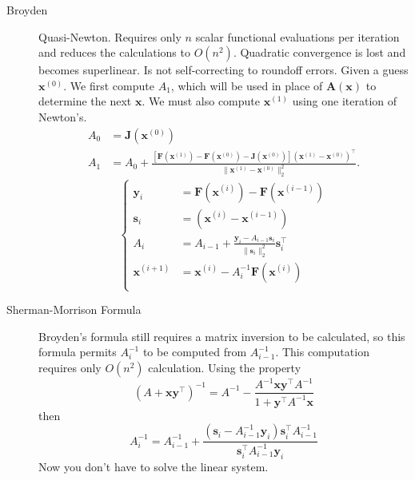 \documentclass[8pt]{article}
\begin{document}
\begin{multicols}{2}
\begin{description}
    \item[Broyden] Quasi-Newton. Requires only $n$ scalar functional evaluations per iteration and
      reduces the calculations to $O(n^2)$.  Quadratic convergence is lost and becomes
      superlinear. Is not self-correcting to roundoff errors. Given a guess $\mathbf{x}^{(0)}$.
      We first compute $A_1$, which will be used in place of $\mathbf{A}(\mathbf{x})$ to determine
      the next $\mathbf{x}$. We must also compute $\mathbf{x}^{(1)}$ using one iteration of Newton's.
      \begin{equation*}
        \begin{aligned}
          A_0&=\mathbf{J}(\mathbf{x}^{(0)}) \\
          A_1&=A_0+\frac{[\mathbf{F}(\mathbf{x}^{(1)}) -
            \mathbf{F}(\mathbf{x}^{(0)}) -
            \mathbf{J}(\mathbf{x}^{(0)})](\mathbf{x}^{(1)}-\mathbf{x}^{(0)})^\top}{\|\mathbf{x}^{(1)}-\mathbf{x}^{(0)}\|^2_2}.
        \end{aligned}
      \end{equation*}
      \begin{equation*}
        \left\{
        \begin{aligned}
          \mathbf{y}_i&=\mathbf{F}(\mathbf{x}^{(i)})-\mathbf{F}(\mathbf{x}^{(i-1)}) \\
          \mathbf{s}_i&=(\mathbf{x}^{(i)}-\mathbf{x}^{(i-1)}) \\
          A_i&=A_{i-1}+\frac{\mathbf{y}_i-A_{i-1}\mathbf{s}_i}{\|\mathbf{s}_i\|^2_2}\mathbf{s}_i^\top \\
          \mathbf{x}^{(i+1)}&=\mathbf{x}^{(i)}-A_i^{-1}\mathbf{F}(\mathbf{x}^{(i)}) \\
        \end{aligned}
        \right.
      \end{equation*}
    \item[Sherman-Morrison Formula] Broyden's formula still requires a matrix inversion to be
      calculated, so this formula permits $A_i^{-1}$ to be computed from $A_{i-1}^{-1}$. This computation
      requires only $O(n^2)$ calculation. Using the property
      $$\left(A+\mathbf{x}\mathbf{y}^\top\right)^{-1} = A^{-1} - \frac{A^{-1}\mathbf{x}\mathbf{y}^\top A^{-1}}{1+\mathbf{y}^\top A^{-1}\mathbf{x}}$$
      then
      $$A_i^{-1}= A_{i-1}^{-1}+\frac{(\mathbf{s}_i - A_{i-1}^{-1}\mathbf{y}_i)\mathbf{s}_i^\top A_{i-1}^{-1}}{\mathbf{s}_i^\top A_{i-1}^{-1} \mathbf{y}_i}$$
      Now you don't have to solve the linear system.
  \end{description}
\end{multicols}
\end{document}
